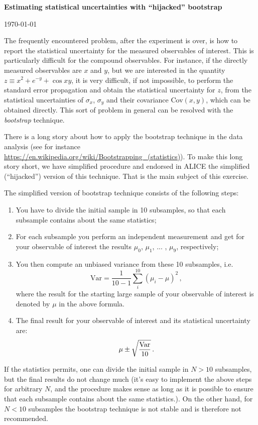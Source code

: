 \documentclass[11pt]{article}
\begin{document}
\begin{center}
\Large{\bf{Estimating statistical uncertainties with ``hijacked'' bootstrap}}\\
\end{center}
\begin{center}
{\small\today}
\end{center}

\bigskip\bigskip\bigskip

\noindent The frequently encountered problem, after the experiment is over, is how to report the statistical uncertainty for the measured observables of interest. This is particularly difficult for the compound observables. For instance, if the directly measured observables are $x$ and $y$, but we are interested in the quantity $z\equiv x^2 + e^{-y} + \cos xy$, it is very difficult, if not impossible, to perform the standard error propagation and obtain the statistical uncertainty for $z$, from the statistical uncertainties of $\sigma_x$, $\sigma_y$ and their covariance Cov$(x,y)$, which can be obtained directly. This sort of problem in general can be resolved with the {\it bootstrap} technique.

There is a long story about how to apply the bootstrap technique in the data analysis (see for instance \url{ https://en.wikipedia.org/wiki/Bootstrapping_(statistics)}). To make this long story short, we have simplified procedure and endorsed in ALICE the simplified (``hijacked'') version of this technique. That is the main subject of this exercise. 

The simplified version of bootstrap technique consists of the following steps:
%
\begin{enumerate}
\item You have to divide the initial sample in 10 subsamples, so that each subsample contains about the same statistics;
%
\item For each subsample you perform an independent measurement and get for your observable of interest the results $\mu_0$, $\mu_1$, ... , $\mu_9$, respectively;
%
\item You then compute an unbiased variance from these 10 subsamples, i.e. 
%
\begin{equation}
\mathrm {Var} = \frac{1}{10-1} \sum_i^{10} (\mu_i-\mu)^2\,, 
\end{equation}
%
where the result for the starting large sample of your observable of interest is denoted by $\mu$ in the above formula.
%
\item The final result for your observable of interest and its statistical uncertainty are:
%
\begin{equation}
\mu \pm \sqrt\frac{\rm Var}{10}\,.
\end{equation}
%
\end{enumerate}
%
If the statistics permits, one can divide the initial sample in $N > 10$ subsamples, but the final results do not change much (it's easy to implement the above steps for arbitrary $N$, and the procedure makes sense as long as it is possible to ensure that each subsample contains about the same statistics.). On the other hand, for $N<10$ subsamples the bootstrap technique is not stable and is therefore not recommended.
\end{document}
